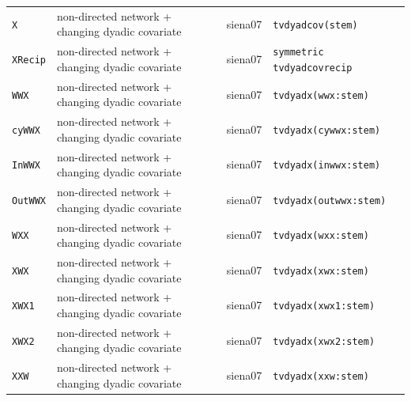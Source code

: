 \begin{longtable}{@{}p{2.6cm}p{3.2cm}p{2.9cm}p{5.4cm}@{}}
\texttt{X} & non-directed network + changing dyadic covariate & siena07 & \texttt{tvdyadcov(stem)}\\
\texttt{XRecip} & non-directed network + changing dyadic covariate & siena07 & \texttt{symmetric tvdyadcovrecip}\\
\texttt{WWX} & non-directed network + changing dyadic covariate & siena07 & \texttt{tvdyadx(wwx:stem)}\\
\texttt{cyWWX} & non-directed network + changing dyadic covariate & siena07 & \texttt{tvdyadx(cywwx:stem)}\\
\texttt{InWWX} & non-directed network + changing dyadic covariate & siena07 & \texttt{tvdyadx(inwwx:stem)}\\
\texttt{OutWWX} & non-directed network + changing dyadic covariate & siena07 & \texttt{tvdyadx(outwwx:stem)}\\
\texttt{WXX} & non-directed network + changing dyadic covariate & siena07 & \texttt{tvdyadx(wxx:stem)}\\
\texttt{XWX} & non-directed network + changing dyadic covariate & siena07 & \texttt{tvdyadx(xwx:stem)}\\
\texttt{XWX1} & non-directed network + changing dyadic covariate & siena07 & \texttt{tvdyadx(xwx1:stem)}\\
\texttt{XWX2} & non-directed network + changing dyadic covariate & siena07 & \texttt{tvdyadx(xwx2:stem)}\\
\texttt{XXW} & non-directed network + changing dyadic covariate & siena07 & \texttt{tvdyadx(xxw:stem)}\\
\bottomrule
\end{longtable}
\normalsize

